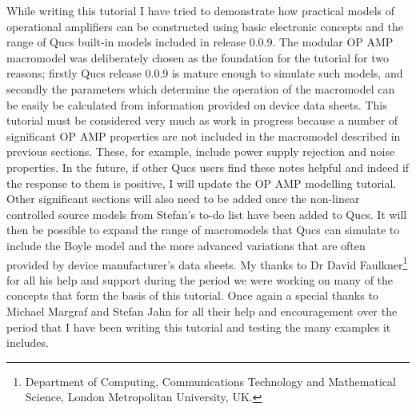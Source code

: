 
While writing this tutorial I have tried to demonstrate how practical models of operational amplifiers can be constructed using basic electronic concepts and the range of Qucs built-in models included in release 0.0.9.  The modular OP AMP macromodel was deliberately chosen as the foundation for the tutorial for two reasons; firstly Qucs release 0.0.9 is mature enough to simulate such models, and secondly the parameters which determine the operation of the macromodel can be easily be calculated from information provided on device data sheets. This tutorial must be considered very much as work in progress because a number of significant OP AMP properties are not included in the macromodel described in previous sections. These, for example, include power supply rejection and noise properties. In the future, if other Qucs users find these notes helpful and indeed if the response to them is positive, I will update the OP AMP modelling tutorial.  Other significant sections will also need to be added once the non-linear controlled source models from Stefan's to-do list have been added to Qucs. It will then be possible to expand the range of macromodels that Qucs can simulate to include the Boyle model and the more advanced variations that are often provided by device manufacturer's data sheets.  My thanks to Dr David Faulkner\footnote{Department of Computing, Communications Technology and Mathematical Science, London Metropolitan University, UK.} for all his help and support during the period we were working on many of the concepts that form the basis of this tutorial. Once again a special thanks to Michael Margraf and Stefan Jahn for all their help and encouragement over the period that I have been writing this tutorial and testing the many examples it includes.
